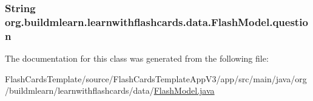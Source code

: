 \subsubsection[{\texorpdfstring{question}{question}}]{\setlength{\rightskip}{0pt plus 5cm}String org.\+buildmlearn.\+learnwithflashcards.\+data.\+Flash\+Model.\+question\hspace{0.3cm}{\ttfamily [private]}}\hypertarget{classorg_1_1buildmlearn_1_1learnwithflashcards_1_1data_1_1FlashModel_a037914c8e0f5866fa6989f498bf41692}{}\label{classorg_1_1buildmlearn_1_1learnwithflashcards_1_1data_1_1FlashModel_a037914c8e0f5866fa6989f498bf41692}


The documentation for this class was generated from the following file\+:\begin{DoxyCompactItemize}
\item 
Flash\+Cards\+Template/source/\+Flash\+Cards\+Template\+App\+V3/app/src/main/java/org/buildmlearn/learnwithflashcards/data/\hyperlink{FlashModel_8java}{Flash\+Model.\+java}\end{DoxyCompactItemize}
